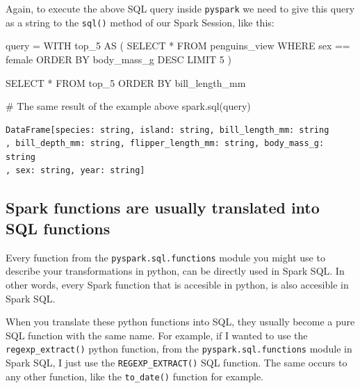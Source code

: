 \documentclass[
  11pt,
  letterpaper,
  DIV=11,
  numbers=noendperiod]{scrreprt}
\newenvironment{Shaded}{\begin{snugshade}}{\end{snugshade}}
\newcommand{\CommentTok}[1]{\textcolor[rgb]{0.37,0.37,0.37}{#1}}
\newcommand{\NormalTok}[1]{\textcolor[rgb]{0.00,0.23,0.31}{#1}}
\newcommand{\OperatorTok}[1]{\textcolor[rgb]{0.37,0.37,0.37}{#1}}
\newcommand{\StringTok}[1]{\textcolor[rgb]{0.13,0.47,0.30}{#1}}
\begin{document}
Again, to execute the above SQL query inside \texttt{pyspark} we need to
give this query as a string to the \texttt{sql()} method of our Spark
Session, like this:

\begin{Shaded}
\begin{Highlighting}[]
\NormalTok{query }\OperatorTok{=} \StringTok{\textquotesingle{}\textquotesingle{}\textquotesingle{}}
\StringTok{WITH top\_5 AS (}
\StringTok{    SELECT *}
\StringTok{    FROM penguins\_view}
\StringTok{    WHERE sex == \textquotesingle{}female\textquotesingle{}}
\StringTok{    ORDER BY body\_mass\_g DESC}
\StringTok{    LIMIT 5}
\StringTok{)}

\StringTok{SELECT *}
\StringTok{FROM top\_5}
\StringTok{ORDER BY bill\_length\_mm}
\StringTok{\textquotesingle{}\textquotesingle{}\textquotesingle{}}

\CommentTok{\# The same result of the example above}
\NormalTok{spark.sql(query)}
\end{Highlighting}
\end{Shaded}

\begin{verbatim}
DataFrame[species: string, island: string, bill_length_mm: string
, bill_depth_mm: string, flipper_length_mm: string, body_mass_g: string
, sex: string, year: string]
\end{verbatim}

\hypertarget{spark-functions-are-usually-translated-into-sql-functions}{%
\subsection{Spark functions are usually translated into SQL
functions}\label{spark-functions-are-usually-translated-into-sql-functions}}

Every function from the \texttt{pyspark.sql.functions} module you might
use to describe your transformations in python, can be directly used in
Spark SQL. In other words, every Spark function that is accesible in
python, is also accesible in Spark SQL.

When you translate these python functions into SQL, they usually become
a pure SQL function with the same name. For example, if I wanted to use
the \texttt{regexp\_extract()} python function, from the
\texttt{pyspark.sql.functions} module in Spark SQL, I just use the
\texttt{REGEXP\_EXTRACT()} SQL function. The same occurs to any other
function, like the \texttt{to\_date()} function for example.
\end{document}
